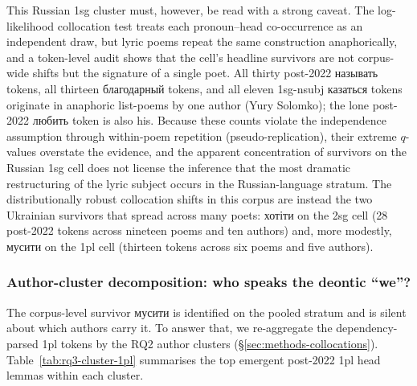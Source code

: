 \documentclass[12pt]{interact}
\theoremstyle{plain}%
\theoremstyle{definition}
\theoremstyle{remark}
\begin{document}
This Russian 1sg cluster must, however, be read with a strong caveat. The log-likelihood collocation test treats each pronoun--head co-occurrence as an independent draw, but lyric poems repeat the same construction anaphorically, and a token-level audit shows that the cell's headline survivors are not corpus-wide shifts but the signature of a single poet. All thirty post-2022 \textukrainian{называть} tokens, all thirteen \textukrainian{благодарный} tokens, and all eleven 1sg-nsubj \textukrainian{казаться} tokens originate in anaphoric list-poems by one author (Yury Solomko); the lone post-2022 \textukrainian{любить} token is also his. Because these counts violate the independence assumption through within-poem repetition (pseudo-replication), their extreme $q$-values overstate the evidence, and the apparent concentration of survivors on the Russian 1sg cell does not license the inference that the most dramatic restructuring of the lyric subject occurs in the Russian-language stratum. The distributionally robust collocation shifts in this corpus are instead the two Ukrainian survivors that spread across many poets: \textukrainian{хотіти} on the 2sg cell (28 post-2022 tokens across nineteen poems and ten authors) and, more modestly, \textukrainian{мусити} on the 1pl cell (thirteen tokens across six poems and five authors).


\subsubsection{Author-cluster decomposition: who speaks the deontic ``we''?}

The corpus-level survivor \textukrainian{мусити} is identified on the pooled stratum and is silent about which authors carry it. To answer that, we re-aggregate the dependency-parsed 1pl tokens by the RQ2 author clusters (\S\ref{sec:methods-collocations}). Table~\ref{tab:rq3-cluster-1pl} summarises the top emergent post-2022 1pl head lemmas within each cluster.
\end{document}
